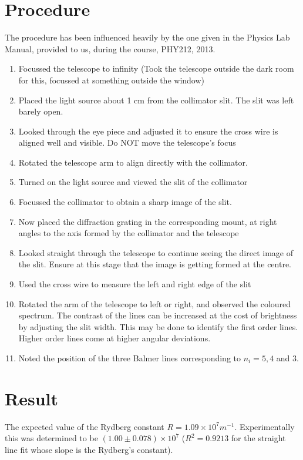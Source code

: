 \section{Procedure}
	The procedure has been influenced heavily by the one given in the Physics Lab Manual, provided to us, during the course, PHY212, 2013.
	\begin{enumerate}
		\item Focussed the telescope to infinity (Took the telescope outside the dark room for this, focussed at something outside the window)
		\item Placed the light source about 1 cm from the collimator slit. The slit was left barely open.
		\item Looked through the eye piece and adjusted it to ensure the cross wire is aligned well and visible. Do NOT move the telescope's focus
		\item Rotated the telescope arm to align directly with the collimator.
		\item Turned on the light source and viewed the slit of the collimator
		\item Focussed the collimator to obtain a sharp image of the slit.
		\item Now placed the diffraction grating in the corresponding mount, at right angles to the axis formed by the collimator and the telescope
		\item Looked straight through the telescope to continue seeing the direct image of the slit. Ensure at this stage that the image is getting formed at the centre.
		\item Used the cross wire to measure the left and right edge of the slit
		\item Rotated the arm of the telescope to left or right, and observed the coloured spectrum. The contrast of the lines can be increased at the cost of brightness by adjusting the slit width. This may be done to identify the first order lines. Higher order lines come at higher angular deviations.
		\item Noted the position of the three Balmer lines corresponding to $n_i=5,4$ and 3.
	\end{enumerate}

\section{Result}
	The expected value of the Rydberg constant $R=1.09 \times 10^7 m^{-1}$. Experimentally this was determined to be $(1.00 \pm 0.078) \times 10^{7}$ ($R^2=0.9213$ for the straight line fit whose slope is the Rydberg's constant).

